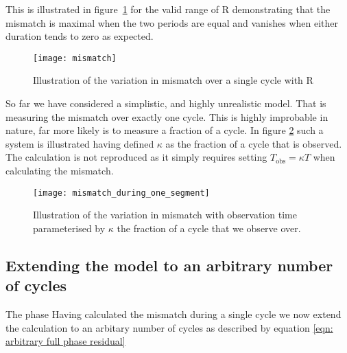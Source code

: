 This is illustrated in figure~\ref{fig: Lyne mismatch} for the valid range of R
demonstrating that the mismatch is maximal when the two periods are equal and
vanishes when either duration tends to zero as expected.

\begin{figure}[ht]
\centering
\texttt{[image: mismatch]}
\caption{Illustration of the variation in mismatch over a single cycle with R}
\label{fig: Lyne mismatch}
\end{figure}

So far we have considered a simplistic, and highly unrealistic model. That is
measuring the mismatch over exactly one cycle. This is highly improbable in nature,
far more likely is to measure a fraction of a cycle. In figure \ref{fig: Lyne mismatch kappa}
such a system is illustrated having defined $\kappa$ as the fraction of a cycle that
is observed. The calculation is not reproduced as it simply requires setting 
$T_{\mathrm{obs}} = \kappa T$ when calculating the mismatch.

\begin{figure}[ht]
\centering
\texttt{[image: mismatch\_during\_one\_segment]}
\caption{Illustration of the variation in mismatch with observation time 
parameterised by $\kappa$ the fraction of a cycle that we observe over.}
\label{fig: Lyne mismatch kappa}
\end{figure}
\FloatBarrier

\subsection{Extending the model to an arbitrary number of cycles} The phase
Having calculated the mismatch during a single cycle we now extend the calculation
to an arbitary number of cycles as described by equation \eqref{eqn: arbitrary full phase residual}

